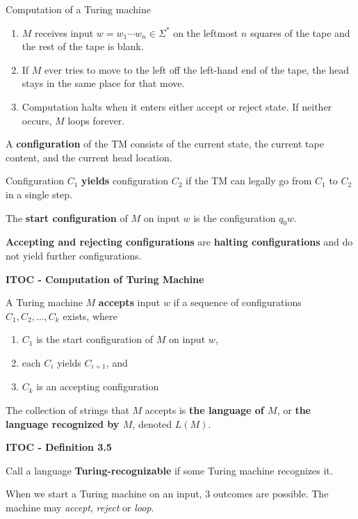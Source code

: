 Computation of a Turing machine
\begin{enumerate}
\item $M$ receives input $w = w_1\cdots w_n \in \Sigma^*$ on the leftmost $n$ squares of the tape and the rest of the tape is blank.
\item If $M$ ever tries to move to the left off the left-hand end of the tape, the head stays in the same place for that move.
\item Computation halts when it enters either accept or reject state. If neither occurs, $M$ loops forever.
\end{enumerate}

A \textbf{configuration} of the TM consists of the current state, the current tape content, and the current head location.

Configuration $C_1$ \textbf{yields} configuration $C_2$ if the TM can legally go from $C_1$ to $C_2$ in a single step.

The \textbf{start configuration} of $M$ on input $w$ is the configuration $q_0w$.

\textbf{Accepting and rejecting configurations} are \textbf{halting configurations} and do not yield further configurations.

\begin{shaded}
\textbf{ITOC - Computation of Turing Machine}

\medskip
A Turing machine $M$ \textbf{accepts} input $w$ if a sequence of configurations $C_1, C_2, \ldots, C_k$ exists, where
\begin{enumerate}
\item $C_1$ is the start configuration of $M$ on input $w$,
\item each $C_i$ yields $C_{i+1}$, and 
\item $C_k$ is an accepting configuration
\end{enumerate}
\end{shaded}

The collection of strings that $M$ accepts is \textbf{the language of $M$}, or \textbf{the language recognized by $M$}, denoted $L(M)$.

\begin{shaded}
\textbf{ITOC - Definition 3.5}

\medskip
Call a language \textbf{Turing-recognizable} if some Turing machine recognizes it.
\end{shaded}

When we start a Turing machine on an input, 3 outcomes are possible. The machine may \textit{accept}, \textit{reject} or \textit{loop}.

